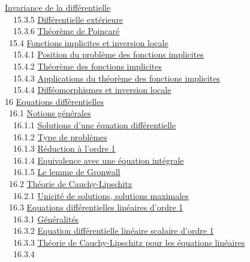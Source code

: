 \documentclass[]{article}
\begin{document}
\href{coursse84.html\#x102-46200015.3.4}{Invariance de la
différentielle} \\ ~~15.3.5
\href{coursse84.html\#x102-46300015.3.5}{Différentielle extérieure} \\
~~15.3.6 \href{coursse84.html\#x102-46400015.3.6}{Théorème de Poincaré}
\\ ~15.4 \href{coursse85.html\#x103-46500015.4}{Fonctions implicites et
inversion locale} \\ ~~15.4.1
\href{coursse85.html\#x103-46600015.4.1}{Position du problème des
fonctions implicites} \\ ~~15.4.2
\href{coursse85.html\#x103-46700015.4.2}{Théorème des fonctions
implicites} \\ ~~15.4.3
\href{coursse85.html\#x103-46800015.4.3}{Applications du théorème des
fonctions implicites} \\ ~~15.4.4
\href{coursse85.html\#x103-46900015.4.4}{Difféomorphismes et inversion
locale} \\ 16 \href{coursch17.html\#x104-47000016}{Equations
différentielles} \\ ~16.1 \href{coursse86.html\#x105-47100016.1}{Notions
générales} \\ ~~16.1.1
\href{coursse86.html\#x105-47200016.1.1}{Solutions d'une équation
différentielle} \\ ~~16.1.2
\href{coursse86.html\#x105-47300016.1.2}{Type de problèmes} \\ ~~16.1.3
\href{coursse86.html\#x105-47400016.1.3}{Réduction à l'ordre 1} \\
~~16.1.4 \href{coursse86.html\#x105-47500016.1.4}{Equivalence avec une
équation intégrale} \\ ~~16.1.5
\href{coursse86.html\#x105-47600016.1.5}{Le lemme de Gronwall} \\ ~16.2
\href{coursse87.html\#x106-47700016.2}{Théorie de Cauchy-Lipschitz} \\
~~16.2.1 \href{coursse87.html\#x106-47800016.2.1}{Unicité de solutions,
solutions maximales} \\ ~16.3
\href{coursse88.html\#x107-47900016.3}{Equations différentielles
linéaires d'ordre 1} \\ ~~16.3.1
\href{coursse88.html\#x107-48000016.3.1}{Généralités} \\ ~~16.3.2
\href{coursse88.html\#x107-48100016.3.2}{Equation différentielle
linéaire scalaire d'ordre 1} \\ ~~16.3.3
\href{coursse88.html\#x107-48200016.3.3}{Théorie de Cauchy-Lipschitz
pour les équations linéaires} \\ ~~16.3.4
\end{document}
